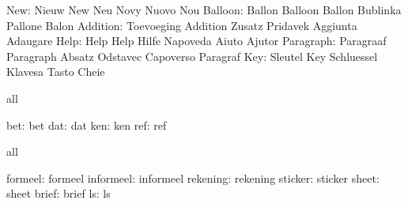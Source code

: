                       New: Nieuw                     New
                           Neu                       Novy
                           Nuovo                     Nou
                  Balloon: Ballon                    Balloon
                           Ballon                    Bublinka
                           Pallone                   Balon
                 Addition: Toevoeging                Addition
                           Zusatz                    Pridavek
                           Aggiunta                  Adaugare
                     Help: Help                      Help
                           Hilfe                     Napoveda
                           Aiuto                     Ajutor
                Paragraph: Paragraaf                 Paragraph
                           Absatz                    Odstavec
                           Capoverso                 Paragraf
                      Key: Sleutel                   Key
                           Schluessel                Klavesa
                           Tasto                     Cheie
\stopvariables




\startconstants            all

                      bet: bet
                      dat: dat
                      ken: ken
                      ref: ref

\stopconstants

\startvariables            all

                  formeel: formeel
                informeel: informeel
                 rekening: rekening
                  sticker: sticker
                    sheet: sheet
                    brief: brief
                       ls: ls

\stopvariables


\stoplogginginterface

\endinput
